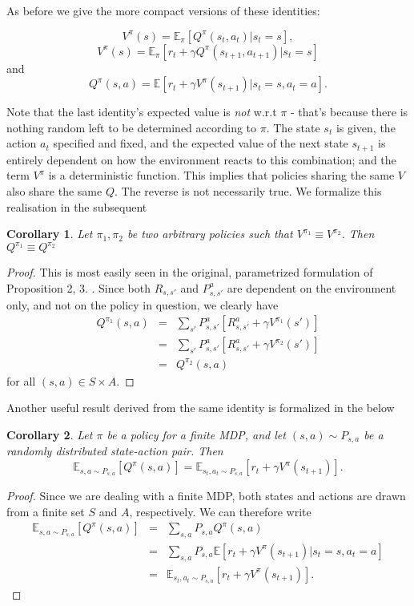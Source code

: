 \documentclass[11pt]{article} %
\newtheorem{cor}{Corollary}
\begin{document}
\newpage

As before we give the more compact versions of these identities:

$$ V^{\pi}(s) =  \mathbb{E}_{\pi}[Q^{\pi}(s_{t},a_{t}) | s_t = s ], $$
$$ V^{\pi}(s) =  \mathbb{E}_{\pi}[r_t + \gamma Q^{\pi}(s_{t+1},a_{t+1}) | s_t = s ] $$ and 
$$ Q^{\pi}(s,a) = \mathbb{E}[r_t + \gamma V^{\pi}(s_{t+1}) | s_t = s, a_t = a]. $$

Note that the last identity's expected value is \textit{not} w.r.t $\pi$ - that's because there is nothing random left to be determined according to $\pi$. The state $s_t$ is given, the action $a_t$ specified and fixed, and the expected value of the next state $s_{t+1}$ is entirely dependent on how the environment reacts to this combination; and the term $V^{\pi}$ is a deterministic function. This implies that policies sharing the same $V$ also share the same $Q$. The reverse is not necessarily true. We formalize this realisation in the subsequent

\begin{cor}
	Let $\pi_1,\pi_2$ be two arbitrary policies such that $V^{\pi_1} \equiv V^{\pi_2}$. Then $Q^{\pi_1} \equiv Q^{\pi_2}$
\end{cor}

\begin{proof}
	This is most easily seen in the original, parametrized formulation of Proposition 2, 3. . Since both $R_{s,s'}$ and $P_{s,s'}^a$ are dependent on the environment only, and not on the policy in question, we clearly have
	\[
		\begin{array}{rll}
			Q^{\pi_1}(s,a) & = &  \sum_{s'} P_{s,s'}^a [ R_{s,s'}^a + \gamma V^{\pi_1}(s') ] \\
						& = & \sum_{s'} P_{s,s'}^a [ R_{s,s'}^a + \gamma V^{\pi_2}(s') ] \\
						& = & Q^{\pi_2}(s,a)
		\end{array}
	\]
	for all $(s,a) \in S \times A$.
\end{proof}

Another useful result derived from the same identity is formalized in the below

\begin{cor}
	Let $\pi$ be a policy for a finite MDP, and let $(s,a) \sim P_{s,a}$ be a randomly distributed state-action pair. Then $$\mathbb{E}_{s, a \sim P_{s,a}}[Q^{\pi}(s,a)] = \mathbb{E}_{s_t, a_t \sim P_{s,a}}[r_t + \gamma V^{\pi}(s_{t+1})].$$
\end{cor}

\begin{proof}
	Since we are dealing with a finite MDP, both states and actions are drawn from a finite set $S$ and $A$, respectively. We can therefore write
	\[
		\begin{array}{rll}
			\mathbb{E}_{s,a \sim  P_{s,a}}[Q^{\pi}(s,a)] 	& = & \sum_{s,a} P_{s,a} Q^{\pi}(s,a) \\
				& = & \sum_{s,a} P_{s,a} \mathbb{E}[r_t + \gamma V^{\pi}(s_{t+1}) | s_t = s, a_t = a] \\
				& = & \mathbb{E}_{s_t,a_t \sim P_{s,a}}[r_t + \gamma V^{\pi}(s_{t+1})].
		\end{array}
	\]
\end{proof}
\end{document}
